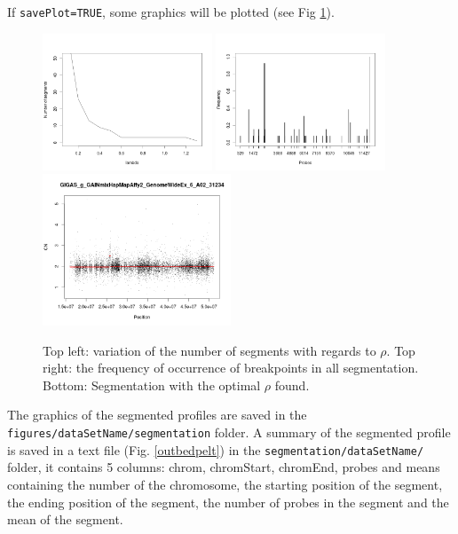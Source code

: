 \documentclass[a4paper,10pt]{article}
\begin{document}
			If \texttt{savePlot=TRUE}, some graphics will be plotted (see Fig \ref{outpelt}).\\
	
		\begin{figure}[!h]
			\centering
			\includegraphics[width=0.45\textwidth]{fig/decdata1}
			\includegraphics[width=0.45\textwidth]{fig/freqdata1}\\		
			\includegraphics[width=0.5\textwidth]{fig/segdata1}
			\caption{Top left: variation of the number of segments with regards to $\rho$. Top right: the frequency of occurrence of breakpoints in all segmentation. Bottom: Segmentation with the optimal $\rho$ found.}
			\label{outpelt}
		\end{figure}
		The graphics of the segmented profiles are saved in the \texttt{figures/dataSetName/segmentation} folder. A summary of the segmented profile is saved in a text file (Fig. \ref{outbedpelt}) in the \texttt{segmentation/dataSetName/} folder, it contains 5 columns: chrom, chromStart, chromEnd, probes and means containing the number of the chromosome, the starting position of the segment, the ending position of the segment, the number of probes in the segment and the mean of the segment.\\
	
\end{document}
